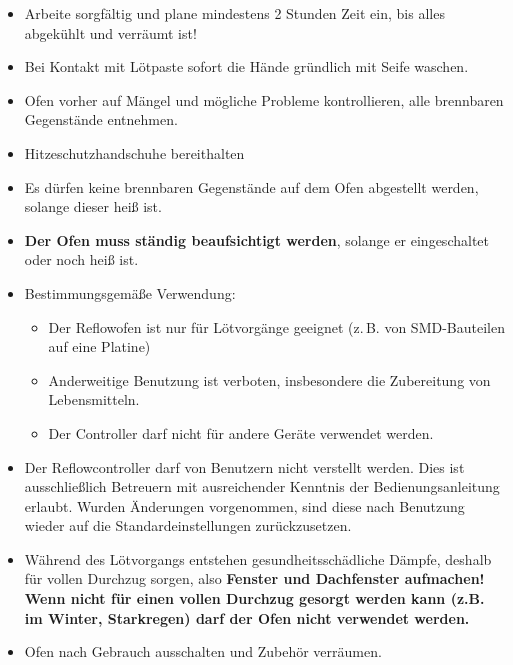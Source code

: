 \documentclass[fontsize=11pt]{scrartcl}
\begin{document}
\begin{itemize}
	\item Arbeite sorgfältig und plane mindestens 2 Stunden Zeit ein, bis alles abgekühlt und verräumt ist!
	\item Bei Kontakt mit Lötpaste sofort die Hände gründlich mit Seife waschen.
	\item Ofen vorher auf Mängel und mögliche Probleme kontrollieren, alle brennbaren Gegenstände entnehmen.
	\item Hitzeschutzhandschuhe bereithalten
	\item Es dürfen keine brennbaren Gegenstände auf dem Ofen abgestellt werden, solange dieser heiß ist.
	\item \textbf{Der Ofen muss ständig beaufsichtigt werden}, solange er eingeschaltet oder noch heiß ist.
	\item Bestimmungsgemäße Verwendung:

\begin{itemize}
	\setlength{\itemsep}{-3pt}
	\item Der Reflowofen ist nur für Lötvorgänge geeignet (z.\,B. von SMD-Bauteilen auf eine Platine)
	\item Anderweitige Benutzung ist verboten, insbesondere die Zubereitung von Lebensmitteln.
	\item Der Controller darf nicht für andere Geräte verwendet werden.
\end{itemize}
	\item Der Reflowcontroller darf von Benutzern nicht verstellt werden. Dies ist ausschließlich Betreuern mit ausreichender Kenntnis der Bedienungsanleitung erlaubt. Wurden Änderungen vorgenommen, sind diese nach Benutzung wieder auf die Standardeinstellungen zurückzusetzen.
	\item Während des Lötvorgangs entstehen gesundheitsschädliche Dämpfe, deshalb für vollen Durchzug sorgen, also \textbf{Fenster und Dachfenster aufmachen! Wenn nicht für einen vollen Durchzug gesorgt werden kann (z.B. im Winter, Starkregen) darf der Ofen nicht verwendet werden.}
	\item Ofen nach Gebrauch ausschalten und Zubehör verräumen.
\end{itemize}
\end{document}
